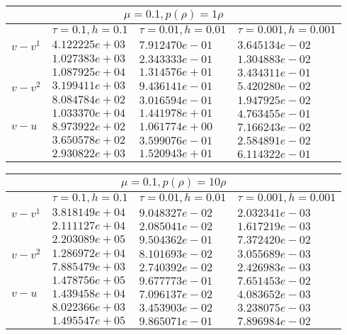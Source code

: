 \begin{center}
    \begin{tabular}{ |l|l|l|l|}
        \hline
        \multicolumn{4}{|c|}{$\mu = 0.1, p(\rho) = 1\rho$} \\
        \hline
        &$\tau = 0.1, h = 0.1$ &$\tau = 0.01, h = 0.01$ &$\tau = 0.001, h = 0.001$ \\
        \hline
        $v-v^{1}$& $4.122225e+03$ & $7.912470e-01$ & $3.645134e-02$ \\
        & $1.027383e+03$ & $2.343333e-01$ & $1.304883e-02$ \\
        & $1.087925e+04$ & $1.314576e+01$ & $3.434311e-01$ \\
        \hline
        $v-v^{2}$& $3.199411e+03$ & $9.436141e-01$ & $5.420280e-02$ \\
        & $8.084784e+02$ & $3.016594e-01$ & $1.947925e-02$ \\
        & $1.033370e+04$ & $1.441978e+01$ & $4.763455e-01$ \\
        \hline
        $v-u$& $8.973922e+02$ & $1.061774e+00$ & $7.166243e-02$ \\
        & $3.650578e+02$ & $3.599076e-01$ & $2.584891e-02$ \\
        & $2.930822e+03$ & $1.520943e+01$ & $6.114322e-01$ \\
        \hline
    \end{tabular}

    \begin{tabular}{ |l|l|l|l|}
        \hline
        \multicolumn{4}{|c|}{$\mu = 0.1, p(\rho) = 10\rho$} \\
        \hline
        &$\tau = 0.1, h = 0.1$ &$\tau = 0.01, h = 0.01$ &$\tau = 0.001, h = 0.001$ \\
        \hline
        $v-v^{1}$& $3.818149e+04$ & $9.048327e-02$ & $2.032341e-03$ \\
        & $2.111127e+04$ & $2.085041e-02$ & $1.617219e-03$ \\
        & $2.203089e+05$ & $9.504362e-01$ & $7.372420e-02$ \\
        \hline
        $v-v^{2}$& $1.286972e+04$ & $8.101693e-02$ & $3.055689e-03$ \\
        & $7.885479e+03$ & $2.740392e-02$ & $2.426983e-03$ \\
        & $1.478756e+05$ & $9.677773e-01$ & $7.651453e-02$ \\
        \hline
        $v-u$& $1.439458e+04$ & $7.096137e-02$ & $4.083652e-03$ \\
        & $8.022366e+03$ & $3.453903e-02$ & $3.238075e-03$ \\
        & $1.495547e+05$ & $9.865071e-01$ & $7.896984e-02$ \\
        \hline
    \end{tabular}
\end{center}
